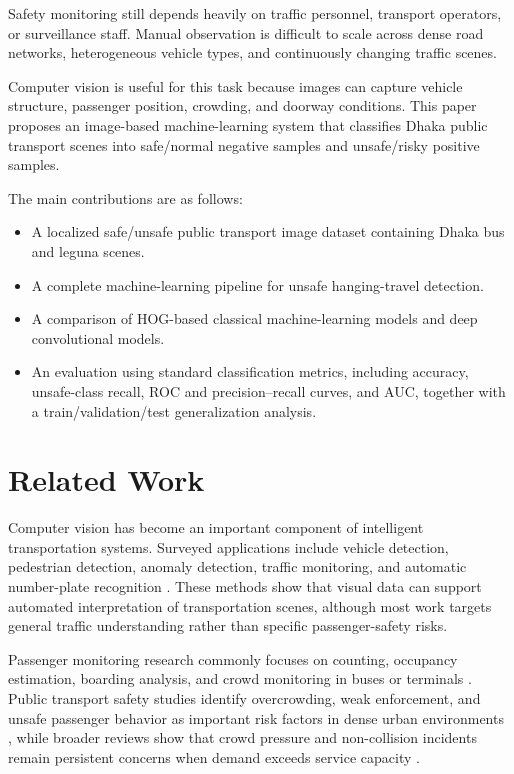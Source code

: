 \documentclass{article}
\begin{document}
Safety monitoring still depends heavily on traffic personnel, transport operators, or surveillance staff. Manual observation is difficult to scale across dense road networks, heterogeneous vehicle types, and continuously changing traffic scenes.

Computer vision is useful for this task because images can capture vehicle structure, passenger position, crowding, and doorway conditions. This paper proposes an image-based machine-learning system that classifies Dhaka public transport scenes into safe/normal negative samples and unsafe/risky positive samples.

The main contributions are as follows:
\begin{itemize}
    \item A localized safe/unsafe public transport image dataset containing Dhaka bus and leguna scenes.
    \item A complete machine-learning pipeline for unsafe hanging-travel detection.
    \item A comparison of HOG-based classical machine-learning models and deep convolutional models.
    \item An evaluation using standard classification metrics, including accuracy, unsafe-class recall, ROC and precision--recall curves, and AUC, together with a train/validation/test generalization analysis.
\end{itemize}

\section{Related Work}
Computer vision has become an important component of intelligent transportation systems. Surveyed applications include vehicle detection, pedestrian detection, anomaly detection, traffic monitoring, and automatic number-plate recognition \cite{dilek2023cvits}. These methods show that visual data can support automated interpretation of transportation scenes, although most work targets general traffic understanding rather than specific passenger-safety risks.

Passenger monitoring research commonly focuses on counting, occupancy estimation, boarding analysis, and crowd monitoring in buses or terminals \cite{hsu2020passenger}. Public transport safety studies identify overcrowding, weak enforcement, and unsafe passenger behavior as important risk factors in dense urban environments \cite{barua2013brt}, while broader reviews show that crowd pressure and non-collision incidents remain persistent concerns when demand exceeds service capacity \cite{crowding2023review}.
\end{document}
